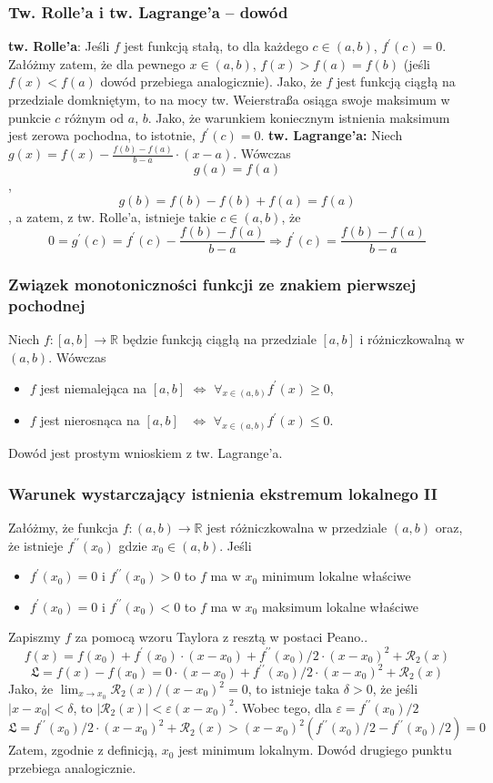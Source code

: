 \documentclass[11pt]{beamer}
\newcommand{\below}[1]{\displaystyle\mathop{#1}}
\begin{document}
\begin{frame}
\frametitle{Tw. Rolle'a i tw. Lagrange'a -- dowód}
{\bf tw. Rolle'a}: Jeśli $f$ jest funkcją stałą, to dla każdego $c \in (a, b)$, $f^\prime(c) = 0$. Załóżmy zatem, że dla pewnego $x \in (a, b)$, $f(x) > f(a) = f(b)$ (jeśli $f(x) < f(a)$ dowód przebiega analogicznie). Jako, że $f$ jest funkcją ciągłą na przedziale domkniętym, to na mocy tw. Weierstraßa osiąga swoje maksimum w punkcie $c$ różnym od $a$, $b$. Jako, że warunkiem koniecznym istnienia maksimum jest zerowa pochodna, to istotnie, $f^\prime(c) = 0$.
\newline
{\bf tw. Lagrange'a:} Niech $g(x) = f(x) - \frac{f(b)-f(a)}{b-a} \cdot(x - a)$. Wówczas \[g(a) = f(a)\], \[g(b) = f(b) - f(b) + f(a) = f(a)\], a zatem, z tw. Rolle'a, istnieje takie $c \in (a, b)$, że \[0 = g^\prime(c) = f^\prime(c) - \frac{f(b)-f(a)}{b-a} \Rightarrow f^\prime(c) = \frac{f(b)-f(a)}{b-a}\]
\end{frame}
\begin{frame}
\frametitle{Związek monotoniczności funkcji ze znakiem pierwszej pochodnej}
Niech $f : [a, b] \rightarrow \mathbb R$ będzie funkcją ciągłą na przedziale $[a, b]$ i różniczkowalną
w $(a, b)$. Wówczas
\begin{itemize}
\item $f$ jest niemalejąca na $[a, b]$ \quad $\Leftrightarrow$ \quad $\below{\forall}_{x \in (a, b)} f^\prime (x) \geq 0$,
\item $f$ jest nierosnąca na $[a, b]$ \, \quad $\Leftrightarrow$ \quad $\below{\forall}_{x \in (a, b)} f^\prime (x) \leq 0$.
\end{itemize}
Dowód jest prostym wnioskiem z tw. Lagrange'a.

\end{frame}

\begin{frame}
\frametitle{Warunek wystarczający istnienia ekstremum lokalnego II}
Załóżmy, że funkcja $f : (a, b)\rightarrow \mathbb{R}$ jest różniczkowalna w przedziale $(a, b)$ oraz, że istnieje $f^{\prime\prime}(x_0)$ gdzie $x_0 \in (a, b)$. Jeśli
\begin{itemize}
\item $f^\prime(x_0) = 0$ i $f^{\prime\prime}(x_0 ) > 0$ to $f$ ma w $x_0$ minimum lokalne właściwe
\item $f^\prime(x_0) = 0$ i $f^{\prime\prime}(x_0 ) < 0$ to $f$ ma w $x_0$ maksimum lokalne właściwe
\end{itemize}
Zapiszmy $f$ za pomocą wzoru Taylora z resztą w postaci Peano..
\[
f(x) = f(x_0) + f^\prime(x_0) \cdot(x - x_0) + f^{\prime\prime}(x_0)/2 \cdot(x-x_0)^2 + \mathcal{R}_2(x)
\]
\[
\mathfrak{L} = f(x) - f(x_0) = 0 \cdot (x-x_0) + f^{\prime\prime}(x_0)/2 \cdot(x-x_0)^2 + \mathcal{R}_2(x)
\]
Jako, że $\below{\lim}_{x\rightarrow x_0} \mathcal{R}_2(x)/(x-x_0)^2 = 0$, to istnieje taka $\delta > 0$, że jeśli $|x - x_0 | < \delta$, to $|\mathcal R_2(x) | < \varepsilon (x - x_0)^2$. Wobec tego, dla $\varepsilon = f^{\prime\prime}(x_0)/2$
\[
\mathfrak{L} = f^{\prime\prime}(x_0)/2 \cdot(x-x_0)^2 + \mathcal{R}_2(x) > (x - x_0)^2\left( f^{\prime\prime}(x_0)/2  - f^{\prime\prime}(x_0)/2\right) = 0
\]
Zatem, zgodnie z definicją, $x_0$ jest minimum lokalnym. Dowód drugiego punktu przebiega analogicznie.
\end{frame}
\end{document}
